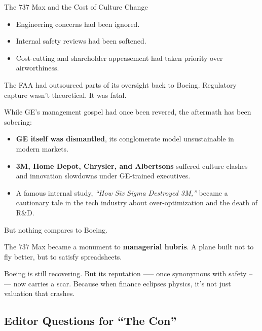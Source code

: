 \begin{HistoricalSidebar}{The 737 Max and the Cost of Culture Change}
  \medskip

  \begin{itemize}
    \item Engineering concerns had been ignored.
    \item Internal safety reviews had been softened.
    \item Cost-cutting and shareholder appeasement had taken priority over airworthiness.
  \end{itemize}

  \medskip
  
  The FAA had outsourced parts of its oversight back to Boeing.  
  Regulatory capture wasn’t theoretical. It was fatal.
  
  \medskip
  
  While GE’s management gospel had once been revered, the aftermath has been sobering:
  
  \medskip

  \begin{itemize}
    \item \textbf{GE itself was dismantled}, its conglomerate model unsustainable in modern markets.
    \item \textbf{3M, Home Depot, Chrysler, and Albertsons} suffered culture clashes and innovation slowdowns under 
    GE-trained executives.
    \item A famous internal study, \textit{“How Six Sigma Destroyed 3M,”} became a cautionary tale in the tech 
    industry about over-optimization and the death of R\&D.
  \end{itemize}

  \medskip
  
  But nothing compares to Boeing.
  
  \medskip
  
  The 737 Max became a monument to \textbf{managerial hubris}.  
  A plane built not to fly better, but to satisfy spreadsheets.
  
  \medskip
  
  Boeing is still recovering. But its reputation —-- once synonymous with safety --— now carries a scar.  
  Because when finance eclipses physics, it’s not just valuation that crashes.
  
\end{HistoricalSidebar}



\subsection*{Editor Questions for ``The Con''}

